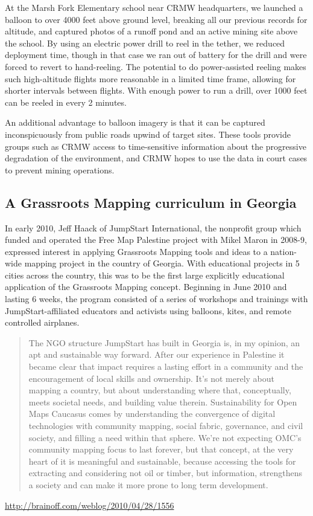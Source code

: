 \documentclass[11pt]{report}
\begin{document}
At the Marsh Fork Elementary school near CRMW headquarters, we launched a balloon to over 4000 feet above ground level, breaking all our previous records for altitude, and captured photos of a runoff pond and an active mining site above the school. By using an electric power drill to reel in the tether, we reduced deployment time, though in that case we ran out of battery for the drill and were forced to revert to hand-reeling. The potential to do power-assisted reeling makes such high-altitude flights more reasonable in a limited time frame, allowing for shorter intervals between flights. With enough power to run a drill, over 1000 feet can be reeled in every 2 minutes. 

An additional advantage to balloon imagery is that it can be captured inconspicuously from public roads upwind of target sites. These tools provide groups such as CRMW access to time-sensitive information about the progressive degradation of the environment, and CRMW hopes to use the data in court cases to prevent mining operations.

\subsection{A Grassroots Mapping curriculum in Georgia}

In early 2010, Jeff Haack of JumpStart International, the nonprofit group which funded and operated the Free Map Palestine project with Mikel Maron in 2008-9, expressed interest in applying Grassroots Mapping tools and ideas to a nation-wide mapping project in the country of Georgia. With educational projects in 5 cities across the country, this was to be the first large explicitly educational application of the Grassroots Mapping concept. Beginning in June 2010 and lasting 6 weeks, the program consisted of a series of workshops and trainings with JumpStart-affiliated educators and activists using balloons, kites, and remote controlled airplanes.

\begin{quote}The NGO structure JumpStart has built in Georgia is, in my opinion, an apt and sustainable way forward. After our experience in Palestine it became clear that impact requires a lasting effort in a community and the encouragement of local skills and ownership. It’s not merely about mapping a country, but about understanding where that, conceptually, meets societal needs, and building value therein. Sustainability for Open Maps Caucasus comes by understanding the convergence of digital technologies with community mapping, social fabric, governance, and civil society, and filling a need within that sphere. We’re not expecting OMC’s community mapping focus to last forever, but that concept, at the very heart of it is meaningful and sustainable, because accessing the tools for extracting and considering not oil or timber, but information, strengthens a society and can make it more prone to long term development.\end{quote} \url{http://brainoff.com/weblog/2010/04/28/1556}
\end{document}

